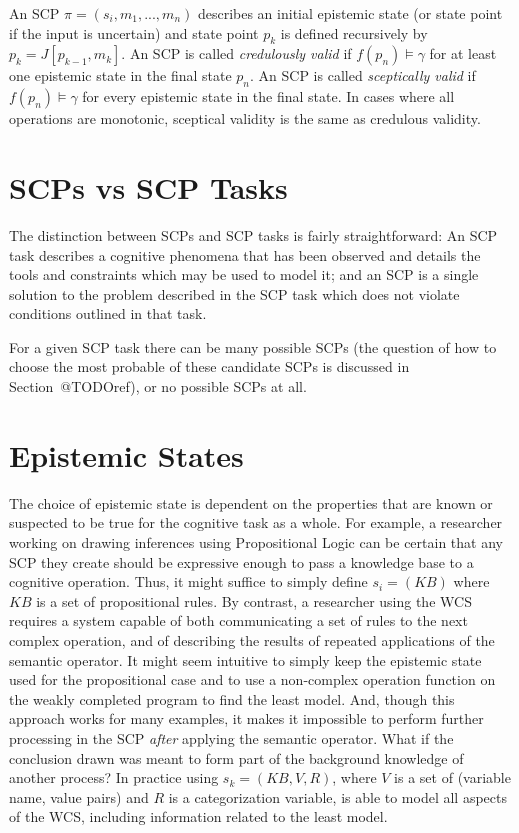 \documentclass[
11pt, %
english, %
singlespacing, %
headsepline, %
]{MastersDoctoralThesis} %
\begin{document}
An SCP $\pi=(s_i,m_1,...,m_n)$ describes an initial epistemic state (or state point if the input is uncertain) and state point $p_k$ is defined recursively by $p_k = J[p_{k-1},m_k]$. An SCP is called \textit{credulously valid} if $f(p_n) \models \gamma$ for at least one epistemic state in the final state $p_n$. An SCP is called \textit{sceptically valid} if $f(p_n) \models \gamma$ for every epistemic state in the final state. In cases where all operations are monotonic, sceptical validity is the same as credulous validity.
\section{SCPs vs SCP Tasks}
The distinction between SCPs and SCP tasks is fairly straightforward: An SCP task describes a cognitive phenomena that has been observed and details the tools and constraints which may be used to model it; and an SCP is a single solution to the problem described in the SCP task which does not violate conditions outlined in that task.

For a given SCP task there can be many possible SCPs (the question of how to choose the most probable of these candidate SCPs is discussed in Section~@TODOref), or no possible SCPs at all.

\section{Epistemic States}
The choice of epistemic state is dependent on the properties that are known or suspected to be true for the cognitive task as a whole. For example, a researcher working on drawing inferences using Propositional Logic can be certain that any SCP they create should be expressive enough to pass a knowledge base to a cognitive operation. Thus, it might suffice to simply define $s_i=(KB)$ where $KB$ is a set of propositional rules. By contrast, a researcher using the WCS requires a system capable of both communicating a set of rules to the next complex operation, and of describing the results of repeated applications of the semantic operator. It might seem intuitive to simply keep the epistemic state used for the propositional case and to use a non-complex operation function on the weakly completed program to find the least model. And, though this approach works for many examples, it makes it impossible to perform further processing in the SCP \textit{after} applying the semantic operator. What if the conclusion drawn was meant to form part of the background knowledge of another process? In practice using $s_k=(KB,V, R)$, where $V$ is a set of (variable name, value pairs) and $R$ is a categorization variable, is able to model all aspects of the WCS, including information related to the least model. 
\end{document}
